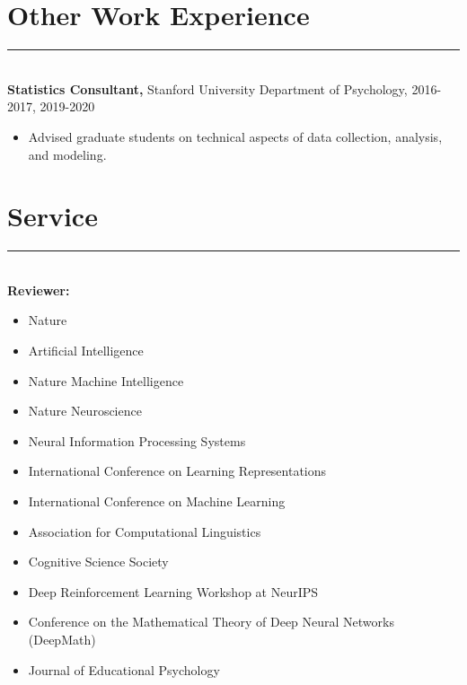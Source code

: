 \documentclass[margin]{res}
\begin{document}
\begin{resume}
\vspace{1pt}\section{Other Work Experience} \vspace{-15pt} \rule{\textwidth}{0.5pt} \\[3pt]
{\bf Statistics Consultant,} Stanford University Department of Psychology, 2016-2017, 2019-2020
\begin{itemize} \itemsep -2pt
 \item Advised graduate students on technical aspects of data collection, analysis, and modeling. \end{itemize}
\vspace{1pt}\section{Service} \vspace{-15pt} \rule{\textwidth}{0.5pt} \\[3pt]
{\bf Reviewer:} 
\begin{itemize} \itemsep -2pt
 \item Nature
 \item Artificial Intelligence
 \item Nature Machine Intelligence 
 \item Nature Neuroscience 
 \item Neural Information Processing Systems
 \item International Conference on Learning Representations 
 \item International Conference on Machine Learning
 \item Association for Computational Linguistics
 \item Cognitive Science Society
 \item Deep Reinforcement Learning Workshop at NeurIPS
 \item Conference on the Mathematical Theory of Deep Neural Networks (DeepMath)
 \item Journal of Educational Psychology
 \end{itemize}

\end{resume}
\end{document}
